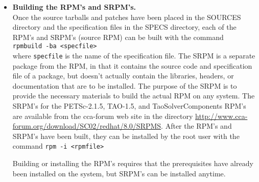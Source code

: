 \documentclass[doublespacing,12pt]{article}
\begin{document}
\begin{itemize}
\item \textbf{Building the RPM's and SRPM's.}\\
Once the source tarballs and patches have been placed in the SOURCES
directory and the specification files in the SPECS directory, each of the RPM's
and SRPM's (source RPM) can be built with the command \\
\texttt{rpmbuild -ba <specfile>}\\
where \texttt{specfile} is the name of the specification file.
The SRPM is a separate package from the RPM, in that it contains the
source code and specification file of a package, but doesn't actually
contain the libraries, headers, or documentation that are to be
installed.  The purpose of the SRPM is to provide the necessary
materials to build the actual RPM on any system.  The SRPM's for the
PETSc-2.1.5, TAO-1.5, and TaoSolverComponents RPM's are available from
the cca-forum web site in the directory
\url{http://www.cca-forum.org/download/SC02/redhat/8.0/SRPMS}.  
After the RPM's and SRPM's have been built, they can be installed by the root
user with the command
\texttt{rpm -i <rpmfile>}

Building or installing the RPM's requires that the prerequisites have
already been installed on the system, but SRPM's can be installed anytime.
\end{itemize}
\end{document}
